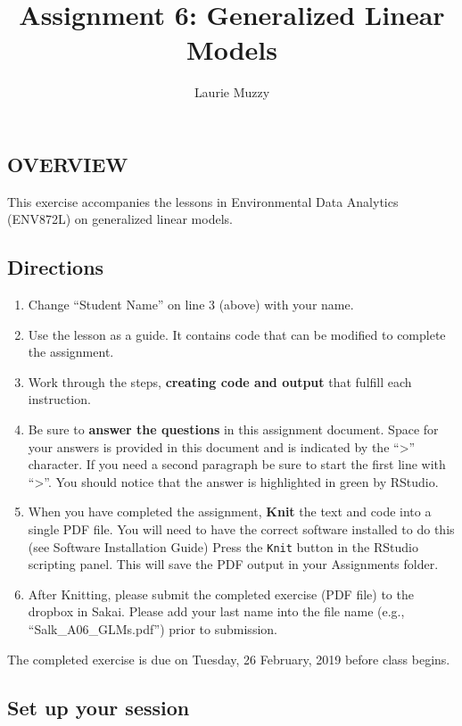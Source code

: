 \documentclass[]{article}
\title{Assignment 6: Generalized Linear Models}
\author{Laurie Muzzy}
\date{}
\providecommand{\tightlist}{%
  \setlength{\itemsep}{0pt}\setlength{\parskip}{0pt}}
\begin{document}
\maketitle

\subsection{OVERVIEW}\label{overview}

This exercise accompanies the lessons in Environmental Data Analytics
(ENV872L) on generalized linear models.

\subsection{Directions}\label{directions}

\begin{enumerate}
\def\labelenumi{\arabic{enumi}.}
\tightlist
\item
  Change ``Student Name'' on line 3 (above) with your name.
\item
  Use the lesson as a guide. It contains code that can be modified to
  complete the assignment.
\item
  Work through the steps, \textbf{creating code and output} that fulfill
  each instruction.
\item
  Be sure to \textbf{answer the questions} in this assignment document.
  Space for your answers is provided in this document and is indicated
  by the ``\textgreater{}'' character. If you need a second paragraph be
  sure to start the first line with ``\textgreater{}''. You should
  notice that the answer is highlighted in green by RStudio.
\item
  When you have completed the assignment, \textbf{Knit} the text and
  code into a single PDF file. You will need to have the correct
  software installed to do this (see Software Installation Guide) Press
  the \texttt{Knit} button in the RStudio scripting panel. This will
  save the PDF output in your Assignments folder.
\item
  After Knitting, please submit the completed exercise (PDF file) to the
  dropbox in Sakai. Please add your last name into the file name (e.g.,
  ``Salk\_A06\_GLMs.pdf'') prior to submission.
\end{enumerate}

The completed exercise is due on Tuesday, 26 February, 2019 before class
begins.

\subsection{Set up your session}\label{set-up-your-session}
\end{document}
